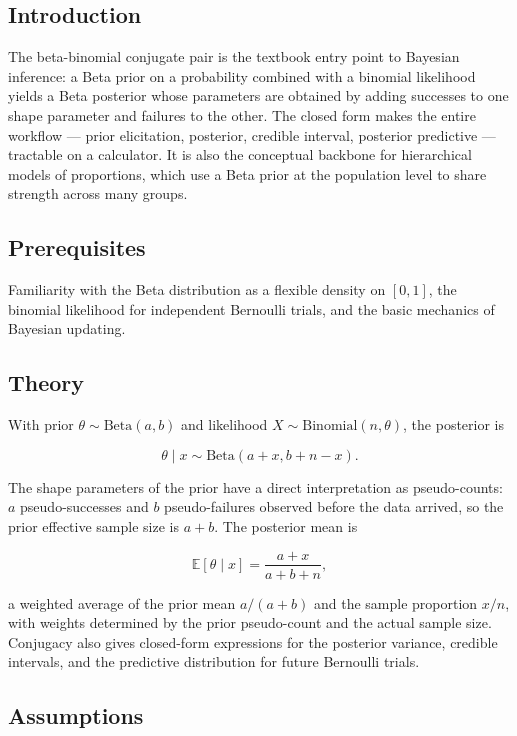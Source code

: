 \documentclass[
]{article}
\author{}
\date{\vspace{-2.5em}}
\begin{document}
\subsection{Introduction}\label{introduction}

The beta-binomial conjugate pair is the textbook entry point to Bayesian
inference: a Beta prior on a probability combined with a binomial
likelihood yields a Beta posterior whose parameters are obtained by
adding successes to one shape parameter and failures to the other. The
closed form makes the entire workflow --- prior elicitation, posterior,
credible interval, posterior predictive --- tractable on a calculator.
It is also the conceptual backbone for hierarchical models of
proportions, which use a Beta prior at the population level to share
strength across many groups.

\subsection{Prerequisites}\label{prerequisites}

Familiarity with the Beta distribution as a flexible density on
\([0, 1]\), the binomial likelihood for independent Bernoulli trials,
and the basic mechanics of Bayesian updating.

\subsection{Theory}\label{theory}

With prior \(\theta \sim \mathrm{Beta}(a, b)\) and likelihood
\(X \sim \mathrm{Binomial}(n, \theta)\), the posterior is

\[\theta \mid x \sim \mathrm{Beta}(a + x, b + n - x).\]

The shape parameters of the prior have a direct interpretation as
pseudo-counts: \(a\) pseudo-successes and \(b\) pseudo-failures observed
before the data arrived, so the prior effective sample size is
\(a + b\). The posterior mean is

\[\mathbb E[\theta \mid x] = \frac{a + x}{a + b + n},\]

a weighted average of the prior mean \(a / (a+b)\) and the sample
proportion \(x / n\), with weights determined by the prior pseudo-count
and the actual sample size. Conjugacy also gives closed-form expressions
for the posterior variance, credible intervals, and the predictive
distribution for future Bernoulli trials.

\subsection{Assumptions}\label{assumptions}
\end{document}
